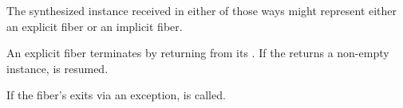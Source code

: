 The synthesized \fiber instance received in either of those ways might
represent either an explicit fiber or an implicit fiber.

An explicit fiber terminates by returning from its \entryfn. If the \entryfn
returns a non-empty \fiber instance,  is resumed.



If the fiber's \entryfn exits via an exception,  is called.



